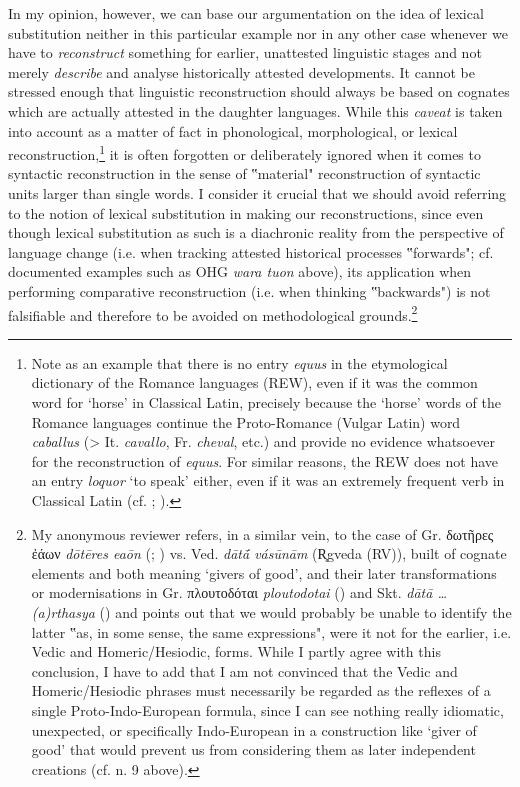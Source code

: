 \documentclass[output=paper,colorlinks,citecolor=brown]{langscibook}
\begin{document}
In my opinion, however, we can base our argumentation on the idea of lexical substitution neither in this particular example nor in any other case whenever we have to \textit{reconstruct} something for earlier, unattested linguistic stages and not merely \textit{describe} and analyse historically attested developments. It cannot be stressed enough that linguistic reconstruction should always be based on cognates which are actually attested in the daughter languages. While this \textit{caveat} is taken into account as a matter of fact in phonological, morphological, or lexical reconstruction,\footnote{Note as an example that there is no entry \textit{equus} in the etymological dictionary of the Romance languages (REW), even if it was the common word for ‘horse’ in Classical Latin, precisely because the ‘horse’ words of the Romance languages continue the Proto-Romance (Vulgar Latin) word \textit{caballus} (> It. \textit{cavallo}, Fr. \textit{cheval}, etc.) and provide no evidence whatsoever for the reconstruction of \textit{equus}. For similar reasons, the REW does not have an entry \textit{loquor} ‘to speak’ either, even if it was an extremely frequent verb in Classical Latin (cf. \citealt[11--12]{Herman2003}; \citealt[32--33]{Adamik2009}).}
it is often forgotten or deliberately ignored when it comes to syntactic reconstruction in the sense of ‟material" reconstruction of syntactic units larger than single words. I consider it crucial that we should avoid referring to the notion of lexical substitution in making our reconstructions, since even though lexical substitution as such is a diachronic reality from the perspective of language change (i.e. when tracking attested historical processes ‟forwards"; cf. documented examples such as OHG \textit{wara tuon} above), its application when performing comparative reconstruction (i.e. when thinking ‟backwards") is not falsifiable and therefore to be avoided on methodological grounds.\footnote{My anonymous reviewer refers, in a similar vein, to the case of Gr. δωτῆρες ἐάων \textit{dōtēres eaōn} (; ) vs. Ved. \textit{dātā́ vásūnām} (R̥gveda (RV)), built of cognate elements and both meaning ‘givers of good’, and their later transformations or modernisations in Gr. πλουτοδόται \textit{ploutodotai} () and Skt. \textit{dātā … (a)rthasya} () and points out that we would probably be unable to identify the latter ‟as, in some sense, the same expressions", were it not for the earlier, i.e. Vedic and Homeric/Hesiodic, forms. While I partly agree with this conclusion, I have to add that I am not convinced that the Vedic and Homeric/Hesiodic phrases must necessarily be regarded as the reflexes of a single Proto-Indo-European formula, since I can see nothing really idiomatic, unexpected, or specifically Indo-European in a construction like ‘giver of good’ that would prevent us from considering them as later independent creations (cf. n. 9 above).}
\end{document}
